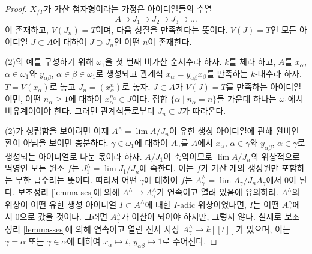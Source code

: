\begin{proof}
$X_{/T}$가 가산 첨자형이라는 가정은 아이디얼들의 수열
$$
A \supset J_1 \supset J_2 \supset J_3 \supset \ldots
$$
이 존재하고, $V(J_n) = T$이며, 다음 성질을 만족한다는 뜻이다.
$V(J) = T$인 모든 아이디얼 $J \subset A$에 대하여
$J \supset J_n$인 어떤 $n$이 존재한다.

\medskip\noindent
(2)의 예를 구성하기 위해 $\omega_1$을 첫 번째 비가산 순서수라
하자. $k$를 체라 하고, $A$를 $x_\alpha$, $\alpha \in \omega_1$와
$y_{\alpha \beta}$, $\alpha \in \beta \in \omega_1$로 생성되고
관계식 $x_\alpha = y_{\alpha \beta} x_\beta$를 만족하는
$k$-대수라 하자. $T = V(x_\alpha)$로 놓고
$J_n = (x_\alpha^n)$로 놓자. $J \subset A$가
$V(J) = T$를 만족하는 아이디얼이면, 어떤 $n_\alpha \geq 1$에
대하여 $x_\alpha^{n_\alpha} \in J$이다. 집합
$\{\alpha \mid n_\alpha = n\}$들 가운데 하나는 $\omega_1$에서
비유계이어야 한다. 그러면 관계식들로부터 $J_n \subset J$가
따라온다.

\medskip\noindent
(2)가 성립함을 보이려면 이제 $A^\wedge = \lim A/J_n$이 유한 생성
아이디얼에 관해 완비인 환이 아님을 보이면 충분하다.
$\gamma \in \omega_1$에 대하여 $A_\gamma$를 $A$에서
$x_\alpha$, $\alpha \in \gamma$와
$y_{\alpha \beta}$, $\alpha \in \gamma$로 생성되는 아이디얼로
나눈 몫이라 하자. $A/J_1$이 축약이므로
$\lim A/J_n$의 위상적으로 멱영인 모든 원소 $f$는
$J_1^\wedge = \lim J_1/J_n$에 속한다. 이는 $f$가 가산 개의
생성원만 포함하는 무한 급수라는 뜻이다. 따라서 어떤 $\gamma$에
대하여 $f$는 $A_\gamma^\wedge = \lim A_\gamma/J_nA_\gamma$에서
0이 된다. 보조정리 \ref{lemma-ses}에 의해
$A^\wedge \to A_\gamma^\wedge$가 연속이고 열려 있음에 유의하라.
$A^\wedge$의 위상이 어떤 유한 생성 아이디얼
$I \subset A^\wedge$에 대한 $I$-adic 위상이었다면, $I$는 어떤
$A_\gamma^\wedge$에서 0으로 갔을 것이다. 그러면
$A_\gamma^\wedge$가 이산이 되어야 하지만, 그렇지 않다. 실제로
보조정리 \ref{lemma-ses}에 의해 연속이고 열린 전사 사상
$A_\gamma^\wedge \to k[[t]]$가 있으며, 이는
$\gamma = \alpha$ 또는 $\gamma \in \alpha$에 대하여
$x_\alpha \mapsto t$, $y_{\alpha \beta} \mapsto 1$로 주어진다.


\end{proof}
